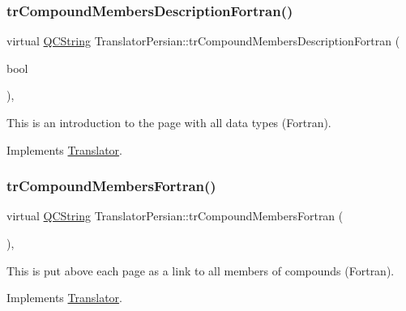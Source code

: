 \subsubsection{\texorpdfstring{trCompoundMembersDescriptionFortran()}{trCompoundMembersDescriptionFortran()}}
{\footnotesize\ttfamily virtual \mbox{\hyperlink{class_q_c_string}{Q\+C\+String}} Translator\+Persian\+::tr\+Compound\+Members\+Description\+Fortran (\begin{DoxyParamCaption}\item[{bool}]{ }\end{DoxyParamCaption})\hspace{0.3cm}{\ttfamily [inline]}, {\ttfamily [virtual]}}

This is an introduction to the page with all data types (Fortran). 

Implements \mbox{\hyperlink{class_translator}{Translator}}.

\mbox{\label{class_translator_persian_a0e8a22b068be61351086db8eefdde1d0}} 
\subsubsection{\texorpdfstring{trCompoundMembersFortran()}{trCompoundMembersFortran()}}
{\footnotesize\ttfamily virtual \mbox{\hyperlink{class_q_c_string}{Q\+C\+String}} Translator\+Persian\+::tr\+Compound\+Members\+Fortran (\begin{DoxyParamCaption}{ }\end{DoxyParamCaption})\hspace{0.3cm}{\ttfamily [inline]}, {\ttfamily [virtual]}}

This is put above each page as a link to all members of compounds (Fortran). 

Implements \mbox{\hyperlink{class_translator}{Translator}}.

\mbox{\label{class_translator_persian_a16c317a4c459e1290c0aa0f1f50f9284}} 
